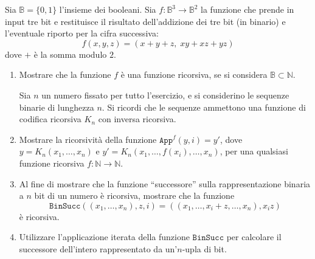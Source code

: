 \newpage

\begin{ex}
Sia $\mathbb B=\{0,1\}$ l'insieme dei booleani. Sia $f:\mathbb B^3\to\mathbb B^2$ la funzione che prende in input tre bit e restituisce il risultato dell'addizione dei tre bit (in binario) e l'eventuale riporto per la cifra successiva:
\[
f(x,y,z)=(x+y+z,\;xy+xz+yz)
\]
dove $+$ è la somma modulo $2$.
\ 
\begin{enumerate}
\item Mostrare che la funzione $f$ è una funzione ricorsiva, se si considera $\mathbb B\subset\mathbb N$.

Sia $n$ un numero fissato per tutto l'esercizio, e si considerino le sequenze binarie di lunghezza $n$. Si ricordi che le sequenze ammettono una funzione di codifica ricorsiva $K_n$ con inversa ricorsiva.
\item Mostrare la ricorsività della funzione $\texttt{App}^f(y,i)=y'$, dove $y=K_n(x_1,\dots,x_n)$ e $y'=K_n(x_1,\dots,f(x_i),\dots,x_n)$, per una qualsiasi funzione ricorsiva $f:\mathbb N\to\mathbb N$.
\item Al fine di mostrare che la funzione ``successore'' sulla rappresentazione binaria a $n$ bit di un numero è ricorsiva, mostrare che la funzione
\[
\texttt{BinSucc}((x_1,\dots,x_n),z,i)=((x_1,\dots,x_i+z,\dots,x_n),x_iz)
\]
è ricorsiva.
\item Utilizzare l'applicazione iterata della funzione $\texttt{BinSucc}$ per calcolare il successore dell'intero rappresentato da un'$n$-upla di bit.
\end{enumerate}
\end{ex}

